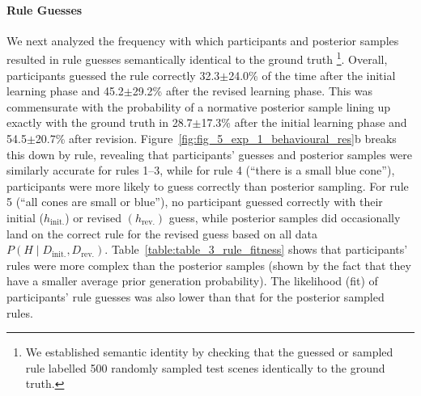 \documentclass[doc,natbib,floatsintext]{apa7}
\newcommand{\dr}{D_{\mathrm{rev.}}}%
\newcommand{\di}{D_{\mathrm{init.}}}%
\newcommand{\hr}{h_{\mathrm{rev.}}}
\newcommand{\hi}{h_{\mathrm{init.}}}
\begin{document}
\paragraph{Rule Guesses}
We next analyzed the frequency with which participants and posterior samples resulted in rule guesses semantically identical to the ground truth \footnote{We established semantic identity by checking that the guessed or sampled rule labelled 500 randomly sampled test scenes identically to the ground truth.}. Overall, participants guessed the rule correctly 32.3$\pm$24.0\% of the time after the initial learning phase and 45.2$\pm$29.2\% after the revised learning phase. This was commensurate with the probability of a normative posterior sample lining up exactly with the ground truth in 28.7$\pm$17.3\% after the initial learning phase and 54.5$\pm$20.7\% after revision. Figure~\ref{fig:fig_5_exp_1_behavioural_res}b breaks this down by rule, revealing that participants' guesses and posterior samples were similarly accurate for rules 1--3, while for rule 4 (``there is a small blue cone''), participants were more likely to guess correctly than posterior sampling. For rule 5  (``all cones are small or blue''), no participant %
guessed correctly with their initial ($\hi$) or revised $(\hr)$ guess, while posterior samples did occasionally land on the correct rule for the revised guess based on all data $P(H\mid\di,\dr)$. Table~\ref{table:table_3_rule_fitness} shows that participants' rules were more complex than the posterior samples (shown by the fact that they have a smaller average prior generation probability). The likelihood (fit) of participants' rule guesses was also lower than that for the posterior sampled rules. 
\end{document}
